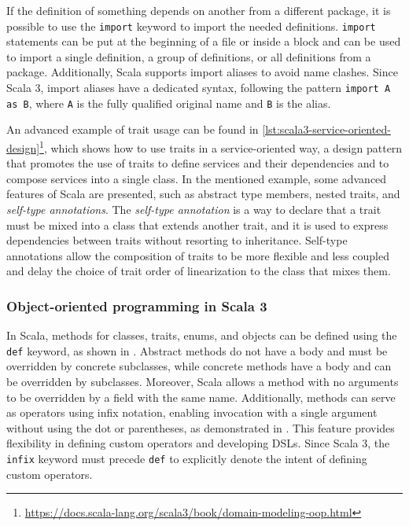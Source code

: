 If the definition of something depends on another from a different package, it is possible to use the \texttt{import} keyword to import the needed definitions.
%
\texttt{import} statements can be put at the beginning of a file or inside a block and can be used to import a single definition, a group of definitions, or all definitions from a package.
%
Additionally, Scala supports import aliases to avoid name clashes.
%
Since Scala 3, import aliases have a dedicated syntax, following the pattern \texttt{import A as B}, where \texttt{A} is the fully qualified original name and \texttt{B} is the alias.

An advanced example of trait usage can be found in \cref{lst:scala3-service-oriented-design}\footnote{\url{https://docs.scala-lang.org/scala3/book/domain-modeling-oop.html}}, which shows how to use traits in a service-oriented way, a design pattern that promotes the use of traits to define services and their dependencies and to compose services into a single class\cite{service-oriented-design}.
%
In the mentioned example, some advanced features of Scala are presented, such as abstract type members, nested traits, and \textit{self-type annotations}.
%
The \textit{self-type annotation} is a way to declare that a trait must be mixed into a class that extends another trait, and it is used to express dependencies between traits without resorting to inheritance.
%
Self-type annotations allow the composition of traits to be more flexible and less coupled and delay the choice of trait order of linearization to the class that mixes them.



\subsubsection{Object-oriented programming in Scala 3}

In Scala, methods for classes, traits, enums, and objects can be defined using the \texttt{def} keyword, as shown in .
%
Abstract methods do not have a body and must be overridden by concrete subclasses, while concrete methods have a body and can be overridden by subclasses.
%
Moreover, Scala allows a method with no arguments to be overridden by a field with the same name.
%
Additionally, methods can serve as operators using infix notation, enabling invocation with a single argument without using the dot or parentheses, as demonstrated in .
%
This feature provides flexibility in defining custom operators and developing \ac{DSL}s.
%
Since Scala 3, the \texttt{infix} keyword must precede \texttt{def} to explicitly denote the intent of defining custom operators.


